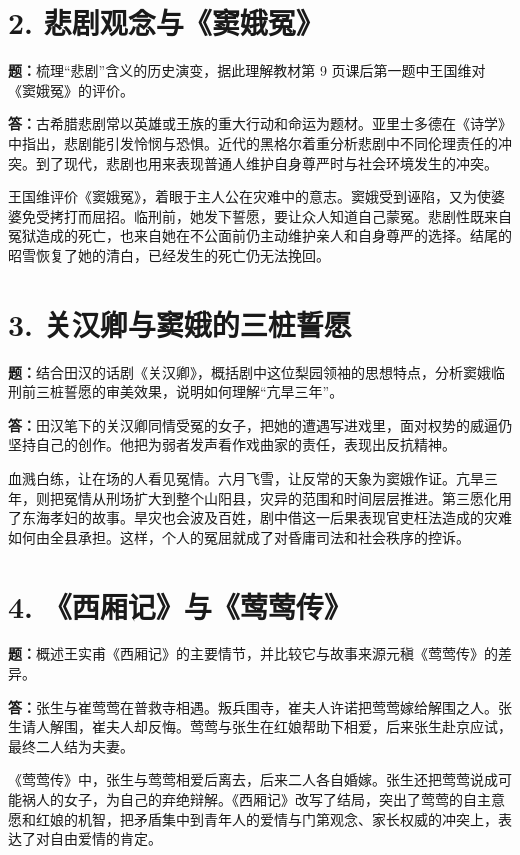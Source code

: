 \documentclass[11pt,a4paper,fontset=windows]{ctexart}
\newenvironment{answer}{\par\begingroup\answerlatin\answercjk}{\par\endgroup}
\begin{document}
\section*{2. 悲剧观念与《窦娥冤》}

\textbf{题：}梳理“悲剧”含义的历史演变，据此理解教材第 9 页课后第一题中王国维对《窦娥冤》的评价。

\begin{answer}
\textbf{答：}古希腊悲剧常以英雄或王族的重大行动和命运为题材。亚里士多德在《诗学》中指出，悲剧能引发怜悯与恐惧。近代的黑格尔着重分析悲剧中不同伦理责任的冲突。到了现代，悲剧也用来表现普通人维护自身尊严时与社会环境发生的冲突。

王国维评价《窦娥冤》，着眼于主人公在灾难中的意志。窦娥受到诬陷，又为使婆婆免受拷打而屈招。临刑前，她发下誓愿，要让众人知道自己蒙冤。悲剧性既来自冤狱造成的死亡，也来自她在不公面前仍主动维护亲人和自身尊严的选择。结尾的昭雪恢复了她的清白，已经发生的死亡仍无法挽回。

\end{answer}
\section*{3. 关汉卿与窦娥的三桩誓愿}

\textbf{题：}结合田汉的话剧《关汉卿》，概括剧中这位梨园领袖的思想特点，分析窦娥临刑前三桩誓愿的审美效果，说明如何理解“亢旱三年”。

\begin{answer}
\textbf{答：}田汉笔下的关汉卿同情受冤的女子，把她的遭遇写进戏里，面对权势的威逼仍坚持自己的创作。他把为弱者发声看作戏曲家的责任，表现出反抗精神。

血溅白练，让在场的人看见冤情。六月飞雪，让反常的天象为窦娥作证。亢旱三年，则把冤情从刑场扩大到整个山阳县，灾异的范围和时间层层推进。第三愿化用了东海孝妇的故事。旱灾也会波及百姓，剧中借这一后果表现官吏枉法造成的灾难如何由全县承担。这样，个人的冤屈就成了对昏庸司法和社会秩序的控诉。

\end{answer}
\section*{4. 《西厢记》与《莺莺传》}

\textbf{题：}概述王实甫《西厢记》的主要情节，并比较它与故事来源元稹《莺莺传》的差异。

\begin{answer}
\textbf{答：}张生与崔莺莺在普救寺相遇。叛兵围寺，崔夫人许诺把莺莺嫁给解围之人。张生请人解围，崔夫人却反悔。莺莺与张生在红娘帮助下相爱，后来张生赴京应试，最终二人结为夫妻。

《莺莺传》中，张生与莺莺相爱后离去，后来二人各自婚嫁。张生还把莺莺说成可能祸人的女子，为自己的弃绝辩解。《西厢记》改写了结局，突出了莺莺的自主意愿和红娘的机智，把矛盾集中到青年人的爱情与门第观念、家长权威的冲突上，表达了对自由爱情的肯定。

\end{answer}
\end{document}
